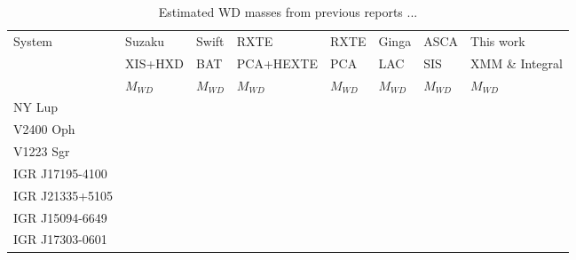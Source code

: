 \documentclass[oneside,a4paper,11pt]{report}
\begin{document}
\begin{table}
\begin{center}
 

\caption{Estimated WD masses from previous reports ...}
\begin{tabular}{llllllll}
\hline
\hline
System & Suzaku & Swift & RXTE & RXTE & Ginga & ASCA& This work  \\
       & XIS+HXD & BAT& PCA+HEXTE & PCA & LAC & SIS & XMM \& Integral                     \\
       & $M_{WD}$ &$M_{WD}$ &$M_{WD} $&$M_{WD}$ &$M_{WD}$ &$M_{WD}$ &$M_{WD}$ \\
\hline
 NY Lup&         &        &          &     &      &         &           \\
 V2400 Oph&         &        &          &     &      &         &           \\
 V1223 Sgr&         &        &          &     &      &         &           \\
 IGR J17195-4100&         &        &          &     &      &         &           \\
 IGR J21335+5105&         &        &          &     &      &         &           \\
 IGR J15094-6649&         &        &          &     &      &         &           \\
 IGR J17303-0601&         &        &          &     &      &         &           \\

\hline
\end{tabular}

\end{center}
\end{table}
\end{document}

